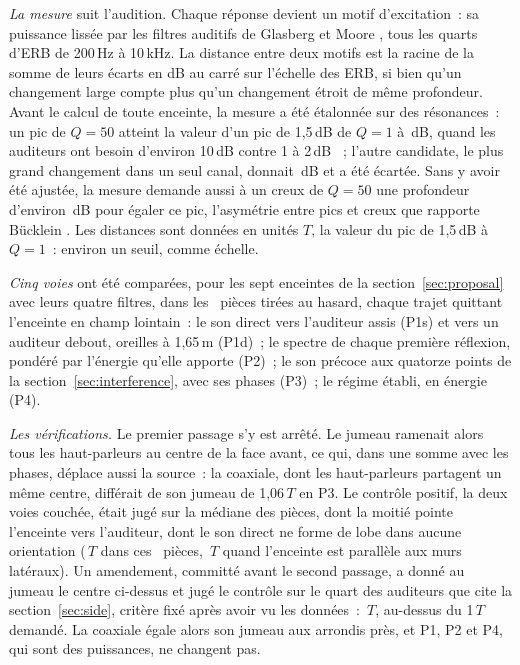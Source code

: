 \documentclass[11pt,a4paper]{article}
\begin{document}
\emph{La mesure} suit l'audition. Chaque réponse devient un motif d'excitation~: sa puissance lissée par
les filtres auditifs de Glasberg et Moore \cite{glasberg1990}, tous les quarts d'ERB de 200\,Hz à
10\,kHz. La distance entre deux motifs est la racine de la somme de leurs écarts en dB au carré sur
l'échelle des ERB, si bien qu'un changement large compte plus qu'un changement étroit de même
profondeur. Avant le calcul de toute enceinte, la mesure a été étalonnée sur des résonances~: un pic de
$Q = 50$ atteint la valeur d'un pic de 1,5\,dB de $Q = 1$ à \nslLfiftyA\,dB, quand les auditeurs ont
besoin d'environ 10\,dB contre 1 à 2\,dB \cite{toole1988}~; l'autre candidate, le plus grand changement
dans un seul canal, donnait \nslLfiftyB\,dB et a été écartée. Sans y avoir été ajustée, la mesure
demande aussi à un creux de $Q = 50$ une profondeur d'environ \nslDipFifty\,dB pour égaler ce pic,
l'asymétrie entre pics et creux que rapporte Bücklein \cite{bucklein1981}. Les distances sont données en
unités $T$, la valeur du pic de 1,5\,dB à $Q = 1$~: environ un seuil, comme échelle.

\emph{Cinq voies} ont été comparées, pour les sept enceintes de la section~\ref{sec:proposal} avec leurs
quatre filtres, dans les \nslRooms\ pièces tirées au hasard, chaque trajet quittant l'enceinte en champ
lointain~: le son direct vers l'auditeur assis (P1s) et vers un auditeur debout, oreilles à 1,65\,m
(P1d)~; le spectre de chaque première réflexion, pondéré par l'énergie qu'elle apporte (P2)~; le son
précoce aux quatorze points de la section~\ref{sec:interference}, avec ses phases (P3)~; le régime établi,
en énergie (P4).

\emph{Les vérifications.} Le premier passage s'y est arrêté. Le jumeau ramenait alors tous les
haut-parleurs au centre de la face avant, ce qui, dans une somme avec les phases, déplace aussi la
source~: la coaxiale, dont les haut-parleurs partagent un même centre, différait de son jumeau de
1,06\,$T$ en P3. Le contrôle positif, la deux voies couchée, était jugé sur la médiane des pièces, dont la
moitié pointe l'enceinte vers l'auditeur, dont le son direct ne forme de lobe dans aucune orientation
(\nslAimMedian\,$T$ dans ces \nslAimRooms\ pièces, \nslStraightMedian\,$T$ quand l'enceinte est
parallèle aux murs latéraux). Un amendement, committé avant le second passage, a donné au jumeau le
centre ci-dessus et jugé le contrôle sur le quart des auditeurs que cite la section~\ref{sec:side},
critère fixé après avoir vu les données~: \nslControl\,$T$, au-dessus du 1\,$T$ demandé. La coaxiale
égale alors son jumeau aux arrondis près, et P1, P2 et P4, qui sont des puissances, ne changent pas.
\end{document}

